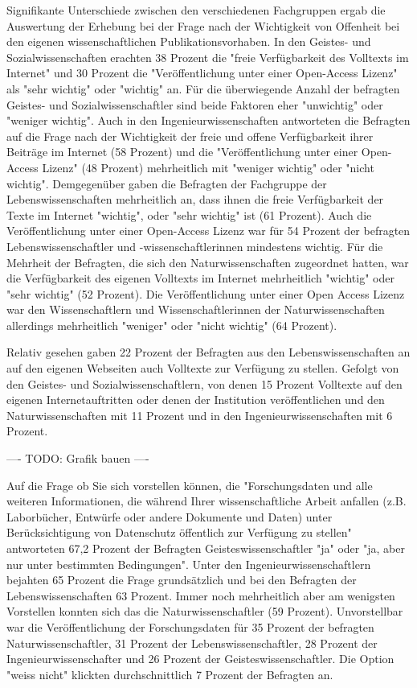 Signifikante Unterschiede zwischen den verschiedenen Fachgruppen ergab die Auswertung der Erhebung bei der Frage nach der Wichtigkeit von Offenheit bei den eigenen wissenschaftlichen Publikationsvorhaben. In den Geistes- und Sozialwissenschaften erachten 38 Prozent die "freie Verfügbarkeit des Volltexts im Internet" und 30 Prozent die "Veröffentlichung unter einer Open-Access Lizenz" als "sehr wichtig" oder "wichtig" an. Für die überwiegende Anzahl der befragten Geistes- und Sozialwissenschaftler sind beide Faktoren eher "unwichtig" oder "weniger wichtig". Auch in den Ingenieurwissenschaften antworteten die Befragten auf die Frage nach der Wichtigkeit der freie und offene Verfügbarkeit ihrer Beiträge im Internet (58 Prozent) und die "Veröffentlichung unter einer Open-Access Lizenz" (48 Prozent) mehrheitlich mit "weniger wichtig" oder "nicht wichtig". Demgegenüber gaben die Befragten der Fachgruppe der Lebenswissenschaften mehrheitlich an, dass ihnen die freie Verfügbarkeit der Texte im Internet "wichtig", oder "sehr wichtig" ist (61 Prozent). Auch die Veröffentlichung unter einer Open-Access Lizenz war für 54 Prozent der befragten Lebenswissenschaftler und -wissenschaftlerinnen mindestens wichtig. Für die Mehrheit der Befragten, die sich den Naturwissenschaften zugeordnet hatten, war die Verfügbarkeit des eigenen Volltexts im Internet mehrheitlich "wichtig" oder "sehr wichtig" (52 Prozent). Die Veröffentlichung unter einer Open Access Lizenz war den Wissenschaftlern und Wissenschaftlerinnen der Naturwissenschaften allerdings mehrheitlich "weniger" oder "nicht wichtig" (64 Prozent).

Relativ gesehen gaben 22 Prozent der Befragten aus den Lebenswissenschaften an auf den eigenen Webseiten auch Volltexte zur Verfügung zu stellen. Gefolgt von den Geistes- und Sozialwissenschaftlern, von denen 15 Prozent Volltexte auf den eigenen Internetauftritten oder denen der Institution veröffentlichen und den Naturwissenschaften mit 11 Prozent und in den Ingenieurwissenschaften mit 6 Prozent.

---- TODO: Grafik bauen ----

Auf die Frage ob Sie sich vorstellen können, die "Forschungsdaten und alle weiteren Informationen, die während Ihrer wissenschaftliche Arbeit anfallen (z.B. Laborbücher, Entwürfe oder andere Dokumente und Daten) unter Berücksichtigung von Datenschutz öffentlich zur Verfügung zu stellen" antworteten 67,2 Prozent der Befragten Geisteswissenschaftler "ja" oder "ja, aber nur unter bestimmten Bedingungen". Unter den Ingenieurwissenschaftlern bejahten 65 Prozent die Frage grundsätzlich und bei den Befragten der Lebenswissenschaften 63 Prozent. Immer noch mehrheitlich aber am wenigsten Vorstellen konnten sich das die Naturwissenschaftler (59 Prozent). Unvorstellbar war die Veröffentlichung der Forschungsdaten für 35 Prozent der befragten Naturwissenschaftler, 31 Prozent der Lebenswissenschaftler, 28 Prozent der Ingenieurwissenschafter und 26 Prozent der Geisteswissenschaftler. Die Option "weiss nicht" klickten durchschnittlich 7 Prozent der Befragten an.

